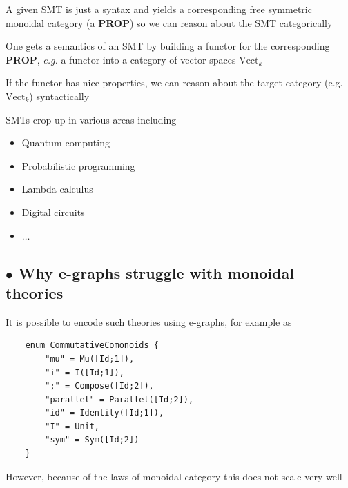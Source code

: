 \documentclass[aspectratio=169]{beamer}
\newcommand{\bsubsection}[1]{\subsection{$\bullet$ #1}}
\begin{document}
\begin{frame}
    \vfill
    A given SMT is just a syntax and yields a corresponding free symmetric monoidal category (a \textbf{PROP}) so we can reason about the SMT categorically

    \vfill

    One gets a semantics of an SMT by building a functor for the corresponding \textbf{PROP}, \textit{e.g.} a functor into a category of vector spaces \textbf{$\text{Vect}_{k}$}

    \vfill

    If the functor has nice properties, we can reason about the target category (e.g. \textbf{$\text{Vect}_{k}$}) syntactically
\end{frame}

\begin{frame}
    SMTs crop up in various areas including
    \begin{itemize}
        \item Quantum computing
        \item Probabilistic programming
        \item Lambda calculus
        \item Digital circuits
        \item $\ldots$
    \end{itemize}
\end{frame}

\bsubsection{Why e-graphs struggle with monoidal theories}

\begin{frame}[containsverbatim]{}

It is possible to encode such theories using e-graphs, for example as

\begin{verbatim}
    enum CommutativeComonoids {
        "mu" = Mu([Id;1]),
        "i" = I([Id;1]),
        ";" = Compose([Id;2]),
        "parallel" = Parallel([Id;2]),
        "id" = Identity([Id;1]),
        "I" = Unit,
        "sym" = Sym([Id;2])   
    }
\end{verbatim}



\end{frame}

\begin{frame}
    However, because of the laws of monoidal category this does not scale very well
\end{frame}
\end{document}
